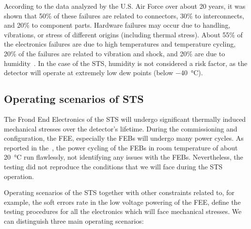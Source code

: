 According to the data analyzed by the U.S. Air Force over about 20 years, it was shown that 50\% of these failures are related to connectors, 30\% to interconnects, and 20\% to component
parts. Hardware failures may occur due to handling, vibrations, or stress of different origins (including thermal stress). About 55\% of the electronics failures are due to high temperatures and temperature cycling, 20\% of the failures are related to vibration and shock, and 20\% are due to humidity~\cite{thermal_electronics}. In the case of the \gls{STS}, humidity is not considered a risk factor, as the detector will operate at extremely low dew points (below \SI{-40}{\celsius}). 

\subsection{Operating scenarios of \gls{STS}}
\label{nominal}
The Frond End Electronics of the \gls{STS} will undergo significant thermally induced mechanical stresses over the detector's lifetime. During the commissioning and configuration, the \gls{FEE}, especially the \glspl{FEB} will undergo many power cycles. As reported in the~\cite{CBM_PR_2021}, the power cycling of the \glspl{FEB} in room temperature of about \SI{20}{\celsius} run flawlessly, not identifying any issues with the \glspl{FEB}. Nevertheless, the testing did not reproduce the conditions that we will face during the \gls{STS} operation.

Operating scenarios of the \gls{STS} together with other constraints related to, for example, the soft errors rate in the low voltage powering of the \gls{FEE}, define the testing procedures for all the electronics which will face mechanical stresses. We can distinguish three main operating scenarios:
